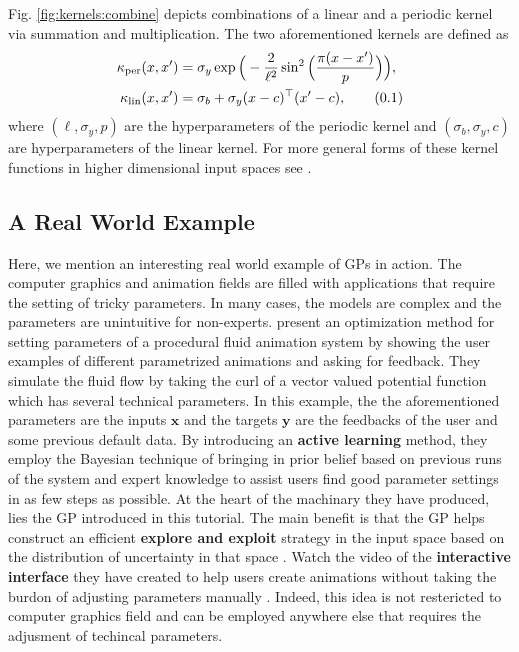 \documentclass[10pt]{article}
\theoremstyle{definition}
\newcommand\eqnum{\addtocounter{equation}{1}\tag{\arabic{section}.\arabic{equation}}}
\begin{document}
Fig. \ref{fig:kernels:combine} depicts combinations of a linear and a periodic kernel via summation and multiplication. The two aforementioned kernels are defined as
\begin{align*}
\kappa_{\text{per}}(x,x') &= \sigma_y\exp\Big(-\frac{2}{\ell^2}\sin^2\Big(\frac{\pi( x-x')}{p}\Big)\Big), \\
\kappa_{\text{lin}}(x, x') &= \sigma_b+\sigma_y(x-c)^{\top}(x'-c),
\eqnum
\end{align*}
where $(\ell, \sigma_y, p)$ are the hyperparameters of the periodic kernel and $(\sigma_b, \sigma_y, c)$ are hyperparameters of the linear kernel. For more general forms of these kernel functions in higher dimensional input spaces see \cite[Section 45.4]{MacKay2003}.
\subsection{A Real World Example}
Here, we mention an interesting real world example of GPs in action. The computer graphics and animation fields are filled with applications that require the setting of tricky parameters. In many cases, the models are complex and the parameters are unintuitive for non-experts. \citeauthor{Brochu2010} \cite{Brochu2010} present an optimization method for setting parameters of a procedural fluid animation system by showing the user examples of different parametrized animations and asking for feedback. They simulate the fluid flow by taking the curl of a vector valued potential function which has several technical parameters. In this example, the the aforementioned parameters are the inputs $\mathbf{x}$ and the targets $\mathbf{y}$ are the feedbacks of the user and some previous default data. By introducing an \textbf{active learning} method, they employ the Bayesian technique of bringing in prior belief based on previous runs of the system and expert knowledge to assist users find good parameter settings in as few steps as possible. At the heart of the machinary they have produced, lies the GP introduced in this tutorial. The main benefit is that the GP helps construct an efficient \textbf{explore and exploit} strategy in the input space based on the distribution of uncertainty in that space \cite[Lecture 9]{Freitas2013}. Watch the video of the \textbf{interactive interface} they have created to help users create animations without taking the burdon of adjusting parameters manually \cite{Brochu2010Animation}. Indeed, this idea is not restericted to computer graphics field and can be employed anywhere else that requires the adjusment of techincal parameters.
\end{document}
